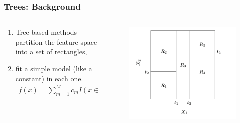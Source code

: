 \documentclass[
  shownotes,
  xcolor={svgnames},
  hyperref={colorlinks,citecolor=DarkBlue,linkcolor=DarkRed,urlcolor=DarkBlue}
  , aspectratio=169]{beamer}
\begin{document}
\begin{frame}[fragile]
\frametitle{Trees: Background}


\begin{columns}[T] %
\begin{column}{.42\textwidth}
  
\begin{enumerate}
\item Tree-based methods partition the feature space into a set of rectangles,
\item  fit a simple model (like a constant) in each one. 
\begin{align}
f(x) = \sum_{m=1}^M c_m I(x\in R_m)
\end{align}
\end{enumerate}


\end{column}  
\hfill
\begin{column}{.48\textwidth}

 \begin{figure}[H] \centering
            \captionsetup{justification=centering}
              \includegraphics[scale=0.6]{figures/cart_final}                           
 \end{figure}

\end{column}
\end{columns}

\end{frame}
\end{document}
